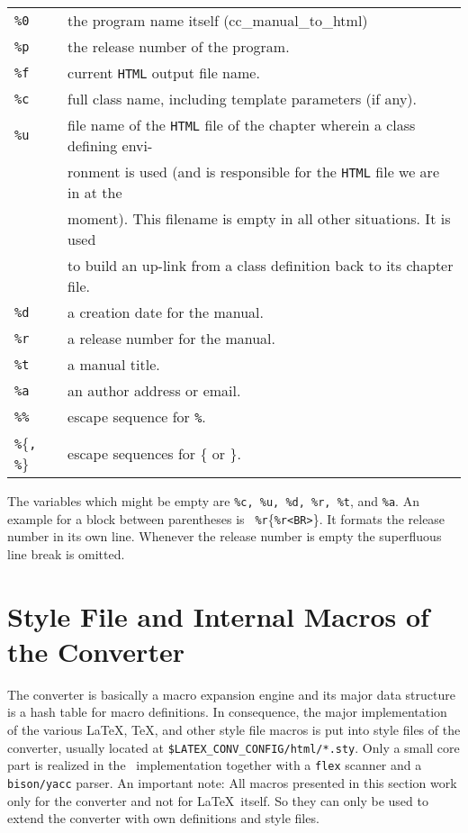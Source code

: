 \documentclass[11pt]{article}
\makeatletter
\newcommand{\TTindex}[1]{\index{#1@{\tt #1}}}
\makeatother
\begin{document}
\begin{tabular}{ll}
    {\tt\%0}  &  the program name itself (cc\_manual\_to\_html) \\
    {\tt\%p}  &  the release number of the program. \\
    {\tt\%f}  &  current {\tt HTML} output file name. \\
    {\tt\%c}  &  full class name, including template parameters (if any). \\
    {\tt\%u}  &  file name of the {\tt HTML} file of the chapter wherein a
    class defining envi- \\ & ronment is used (and is responsible for the
    {\tt HTML} file we are in at the\\ &  moment). This filename is empty
    in all other situations. It is used \\ & to build an up-link from a
    class definition back to its chapter file. \\
    {\tt\%d}  &  a creation date for the manual.\\
    {\tt\%r}  &  a release number for the manual.\\
    {\tt\%t}  &  a manual title. \\
    {\tt\%a}  &  an author address or email.\\
    {\tt\%\%}  &  escape sequence for {\tt\%}.\\
    {\tt\%}\{{\tt , \%}\}  &  escape sequences for \{ or \}.
\end{tabular}

The variables which might be empty are {\tt\%c, \%u, \%d, \%r, \%t},
and {\tt\%a}.  An example for a block between parentheses is {\tt
  \%r}\{{\tt \%r<BR>}\}. It formats the release number in its own line.
Whenever the release number is empty the superfluous line break
is omitted.

\section{Style File and Internal Macros of the Converter}

The converter is basically a macro expansion engine and its major data
structure is a hash table for macro definitions. In consequence, the
major implementation of the various \LaTeX, \TeX, and other style file
macros is put into style files of the converter, usually located at
{\tt \$\Open LATEX\_CONV\_CONFIG\Close/html/*.sty}. Only a small core
part is realized in the \CC\ implementation together with a {\tt flex}
scanner and a {\tt bison/yacc} parser. An important note: All macros
presented in this section work only for the converter and not for
\LaTeX\ itself. So they can only be used to extend the converter with own
definitions and style files.
\TTindex{flex}\TTindex{bison}\TTindex{yacc}
\end{document}
